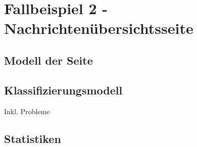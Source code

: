 \section{Fallbeispiel 2 - Nachrichtenübersichtsseite}
    \subsection{Modell der Seite}
    \subsection{Klassifizierungsmodell}
        Inkl. Probleme
    \subsection{Statistiken}
